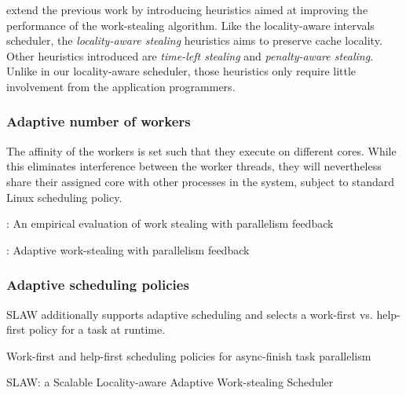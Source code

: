 \textcite{Gaud2010} extend the previous work by introducing heuristics
aimed at improving the performance of the work-stealing
algorithm. Like the locality-aware intervals scheduler, the
\emph{locality-aware stealing} heuristics aims to preserve cache
locality. Other heuristics introduced are \emph{time-left stealing}
and \emph{penalty-aware stealing}. Unlike in our locality-aware
scheduler, those heuristics only require little involvement from the
application programmers.

\subsubsection{Adaptive number of workers}

The affinity of the workers is set such that they execute on different
cores. While this eliminates interference between the worker threads,
they will nevertheless share their assigned core with other processes
in the system, subject to standard Linux scheduling policy. 

\textcite{Agrawal2006}: An empirical evaluation of work stealing with
parallelism feedback

\textcite{Agrawal2007}: Adaptive work-stealing with parallelism
feedback

\subsubsection{Adaptive scheduling policies}

SLAW additionally supports adaptive scheduling and selects a
work-first vs. help-first policy for a task at runtime.

\textcite{Guo2009} Work-first and help-first scheduling policies for
async-finish task parallelism

\textcite{Guo2010} SLAW: a Scalable Locality-aware Adaptive
Work-stealing Scheduler




